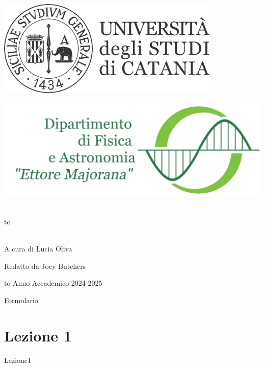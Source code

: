 \documentclass[openany,12pt]{article}
\newcommand\blankpage{%
    \null
    \thispagestyle{empty}%
    \newpage} %
\begin{document}
\thispagestyle{empty}
\begin{center}

\begin{minipage}[c]{0.45\textwidth}
\begin{flushleft}
\includegraphics[width=0.8\textwidth]{logo-unict-orizzontale-grigio.png}
\end{flushleft}
\end{minipage}
\hfill
\begin{minipage}[c]{0.45\textwidth}
\begin{flushright}
\includegraphics[width=\textwidth]{logo_dfa_orizzontale}
\end{flushright}
\end{minipage}\\
\medskip
\hbox to \textwidth{\hrulefill}

\vfill
\vfill

\uppercase{}\\

\vfill
\large{A cura di Lucia Oliva}

\vfill
\large{Redatto da Joey Butchers}

\vfill
\vfill
\hbox to \textwidth{\hrulefill}
{\sc Anno Accademico 2024-2025}
\end{center}

\afterpage{\blankpage}
\newpage


\newpage

{Formulario}

\newpage

\section{Lezione 1}
{Lezione1}

\newpage

\end{document}
